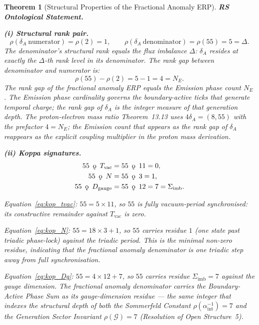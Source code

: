 \documentclass[11pt, letterpaper]{article}
\newcommand{\koppa}{\mathbin{\text{\rm\k{o}}}}
\theoremstyle{definition}
\theoremstyle{plain}
\newtheorem{theorem}{Theorem}[section]
\begin{document}
\begin{theorem}[Structural Properties of the Fractional Anomaly ERP]

\textbf{RS Ontological Statement.}

\noindent\textbf{(i) Structural rank pair.}
\begin{equation}
    \rho(\delta_A\ \text{numerator}) = \rho(2) = 1, \qquad
    \rho(\delta_A\ \text{denominator}) = \rho(55) = 5 = \Delta.
    \label{eq:delta_ranks}
\end{equation}
The denominator's structural rank equals the flux imbalance $\Delta$: $\delta_A$
resides at exactly the $\Delta$-th rank level in its denominator. The rank gap between
denominator and numerator is:
\begin{equation}
    \rho(55) - \rho(2) = 5 - 1 = 4 = N_E.
    \label{eq:rank_gap}
\end{equation}
The rank gap of the fractional anomaly ERP equals the Emission phase count $N_E$.
The Emission phase cardinality governs the boundary-active ticks that generate temporal
charge; the rank gap of $\delta_A$ is the integer measure of that generation depth.
The proton-electron mass ratio Theorem~13.13 uses $4\delta_A = (8, 55)$ with the
prefactor $4 = N_E$; the Emission count that appears as the rank gap of $\delta_A$
reappears as the explicit coupling multiplier in the proton mass derivation.

\noindent\textbf{(ii) Koppa signatures.}
\begin{align}
    55 \;\koppa\; T_\mathrm{vac} &= 55 \;\koppa\; 11 = 0, \label{eq:kop_tvac}\\
    55 \;\koppa\; N &= 55 \;\koppa\; 3 = 1, \label{eq:kop_N}\\
    55 \;\koppa\; D_\mathrm{gauge} &= 55 \;\koppa\; 12 = 7 = \Sigma_\mathrm{imb}.
    \label{eq:kop_Dg}
\end{align}

Equation~\eqref{eq:kop_tvac}: $55 = 5 \times 11$, so $55$ is fully vacuum-period
synchronised: its constructive remainder against $T_\mathrm{vac}$ is zero.

Equation~\eqref{eq:kop_N}: $55 = 18 \times 3 + 1$, so $55$ carries residue $1$ (one
state past triadic phase-lock) against the triadic period. This is the minimal
non-zero residue, indicating that the fractional anomaly denominator is one triadic
step away from full synchronisation.

Equation~\eqref{eq:kop_Dg}: $55 = 4 \times 12 + 7$, so $55$ carries residue
$\Sigma_\mathrm{imb} = 7$ against the gauge dimension. The fractional anomaly
denominator carries the Boundary-Active Phase Sum as its gauge-dimension residue —
the same integer that indexes the structural depth of both the Sommerfeld Constant
$\rho(\alpha^{-1}_\mathrm{int}) = 7$ and the Generation Sector Invariant
$\rho(\mathcal{G}) = 7$ (Resolution of Open Structure~5).


\end{theorem}
\end{document}
